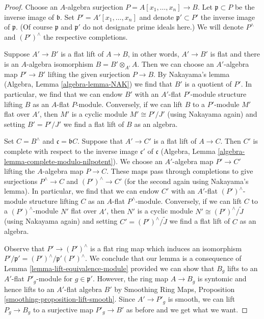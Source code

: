 \begin{proof}
Choose an $A$-algebra surjection $P = A[x_1, \ldots, x_n] \to B$.
Let $\mathfrak p \subset P$ be the inverse image of $\mathfrak b$.
Set $P' = A'[x_1, \ldots, x_n]$ and denote $\mathfrak p' \subset P'$
the inverse image of $\mathfrak p$. (Of course $\mathfrak p$
and $\mathfrak p'$ do not designate prime ideals here.)
We will denote $P^\wedge$ and $(P')^\wedge$ the respective completions.

\medskip\noindent
Suppose $A' \to B'$ is a flat lift of $A \to B$, in other words,
$A' \to B'$ is flat and there is an $A$-algebra isomorphism
$B = B' \otimes_{A'} A$. Then we can choose an $A'$-algebra map
$P' \to B'$ lifting the given surjection $P \to B$.
By Nakayama's lemma (Algebra, Lemma \ref{algebra-lemma-NAK})
we find that $B'$ is a quotient of $P'$. In particular, we find
that we can endow $B'$ with an $A'$-flat $P'$-module structure
lifting $B$ as an $A$-flat $P$-module.
Conversely, if we can lift $B$ to a $P'$-module $M'$ flat over $A'$,
then $M'$ is a cyclic module $M' \cong P'/J'$ (using Nakayama again)
and setting $B' = P'/J'$ we find a flat lift of $B$ as an algebra.

\medskip\noindent
Set $C = B^\wedge$ and $\mathfrak c = \mathfrak bC$.
Suppose that $A' \to C'$ is a flat lift of $A \to C$.
Then $C'$ is complete with respect to the inverse image $\mathfrak c'$
of $\mathfrak c$
(Algebra, Lemma \ref{algebra-lemma-complete-modulo-nilpotent}).
We choose an $A'$-algebra map $P' \to C'$ lifting
the $A$-algebra map $P \to C$. These maps pass through
completions to give surjections $P^\wedge \to C$ and $(P')^\wedge \to C'$
(for the second again using Nakayama's lemma).
In particular, we find that we can endow $C'$ with an $A'$-flat
$(P')^\wedge$-module structure lifting $C$ as an $A$-flat $P^\wedge$-module.
Conversely, if we can lift $C$ to a $(P')^\wedge$-module $N'$ flat over $A'$,
then $N'$ is a cyclic module $N' \cong (P')^\wedge/\tilde J$
(using Nakayama again) and setting $C' = (P')^\wedge/\tilde J$
we find a flat lift of $C$ as an algebra.

\medskip\noindent
Observe that $P' \to (P')^\wedge$ is a flat ring map which
induces an isomorphism $P'/\mathfrak p' = (P')^\wedge/\mathfrak p'(P')^\wedge$.
We conclude that our lemma is a consequence of
Lemma \ref{lemma-lift-equivalence-module} provided we can
show that $B_g$ lifts to an $A'$-flat $P'_g$-module for
$g \in \mathfrak p'$. However, the ring map $A \to B_g$ is syntomic
and hence lifts to an $A'$-flat algebra $B'$ by
Smoothing Ring Maps, Proposition \ref{smoothing-proposition-lift-smooth}.
Since $A' \to P'_g$ is smooth, we can lift $P_g \to B_g$
to a surjective map $P'_g \to B'$ as before and we get what we want.
\end{proof}







